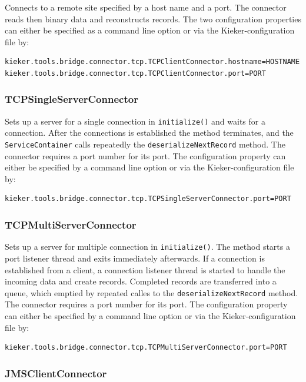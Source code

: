 \documentclass[11pt,a4paper]{article}
\begin{document}
Connects to a remote site specified by a host name and a port. The connector reads then binary data and reconstructs records. The two configuration properties can either be specified as a command line option or via the Kieker-configuration file by:

\begin{verbatim}
kieker.tools.bridge.connector.tcp.TCPClientConnector.hostname=HOSTNAME
kieker.tools.bridge.connector.tcp.TCPClientConnector.port=PORT
\end{verbatim}

%
\subsubsection{TCPSingleServerConnector}

Sets up a server for a single connection in \texttt{initialize()} and waits for a connection. After the connections is established the method terminates, and the \texttt{ServiceContainer} calls repeatedly the \texttt{deserializeNextRecord} method. The connector requires a port number for its port. The configuration property can either be specified by a command line option or via the Kieker-configuration file by:

\begin{verbatim}
kieker.tools.bridge.connector.tcp.TCPSingleServerConnector.port=PORT
\end{verbatim}

%
\subsubsection{TCPMultiServerConnector}

Sets up a server for multiple connection in \texttt{initialize()}. The method starts a port listener thread and exits immediately afterwards. If a connection is established from a client, a connection listener thread is started to handle the incoming data and create records. Completed records are transferred into a queue, which emptied by repeated calles to the \texttt{deserializeNextRecord} method. The connector requires a port number for its port. The configuration property can either be specified by a command line option or via the Kieker-configuration file by:

\begin{verbatim}
kieker.tools.bridge.connector.tcp.TCPMultiServerConnector.port=PORT
\end{verbatim}

%
\subsubsection{JMSClientConnector}
\end{document}
